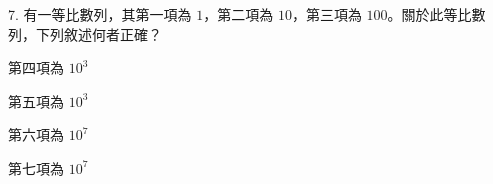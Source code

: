 \documentclass[12pt]{article}
\begin{document}
\begin{problem}
  \item[7.] 有一等比數列，其第一項為 $1$，第二項為 $10$，第三項為 $100$。關於此等比數列，下列敘述何者正確？
  \begin{choices}
    \item 第四項為 $10^3$
    \item 第五項為 $10^3$
    \item 第六項為 $10^7$
    \item 第七項為 $10^7$
  \end{choices}
\end{problem}
\end{document}
